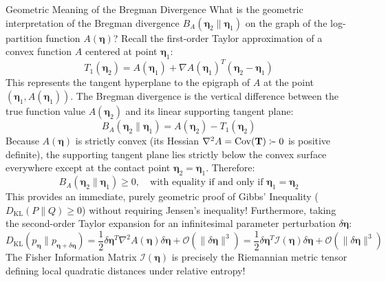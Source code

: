 \begin{ponderbox}{Geometric Meaning of the Bregman Divergence}
What is the geometric interpretation of the Bregman divergence $B_A(\boldsymbol{\eta}_2 \parallel \boldsymbol{\eta}_1)$ on the graph of the log-partition function $A(\boldsymbol{\eta})$?
\tcblower
Recall the first-order Taylor approximation of a convex function $A$ centered at point $\boldsymbol{\eta}_1$:
\begin{equation*}
T_1(\boldsymbol{\eta}_2) = A(\boldsymbol{\eta}_1) + \nabla A(\boldsymbol{\eta}_1)^T (\boldsymbol{\eta}_2 - \boldsymbol{\eta}_1)
\end{equation*}
This represents the tangent hyperplane to the epigraph of $A$ at the point $(\boldsymbol{\eta}_1, A(\boldsymbol{\eta}_1))$.
The Bregman divergence is the vertical difference between the true function value $A(\boldsymbol{\eta}_2)$ and its linear supporting tangent plane:
\begin{equation*}
B_A(\boldsymbol{\eta}_2 \parallel \boldsymbol{\eta}_1) = A(\boldsymbol{\eta}_2) - T_1(\boldsymbol{\eta}_2)
\end{equation*}
Because $A(\boldsymbol{\eta})$ is strictly convex (its Hessian $\nabla^2 A = \operatorname{Cov}(\mathbf{T}) \succ 0$ is positive definite), the supporting tangent plane lies strictly below the convex surface everywhere except at the contact point $\boldsymbol{\eta}_2 = \boldsymbol{\eta}_1$.
Therefore:
\begin{equation*}
B_A(\boldsymbol{\eta}_2 \parallel \boldsymbol{\eta}_1) \ge 0, \quad \text{with equality if and only if } \boldsymbol{\eta}_1 = \boldsymbol{\eta}_2
\end{equation*}
This provides an immediate, purely geometric proof of Gibbs' Inequality ($D_{\text{KL}}(P \parallel Q) \ge 0$) without requiring Jensen's inequality! Furthermore, taking the second-order Taylor expansion for an infinitesimal parameter perturbation $\delta \boldsymbol{\eta}$:
\begin{equation}
D_{\text{KL}}\left( p_{\boldsymbol{\eta}} \parallel p_{\boldsymbol{\eta} + \delta \boldsymbol{\eta}} \right) = \frac{1}{2}\delta \boldsymbol{\eta}^T \nabla^2 A(\boldsymbol{\eta}) \delta \boldsymbol{\eta} + \mathcal{O}(\|\delta \boldsymbol{\eta}\|^3) = \frac{1}{2}\delta \boldsymbol{\eta}^T \mathcal{I}(\boldsymbol{\eta}) \delta \boldsymbol{\eta} + \mathcal{O}(\|\delta \boldsymbol{\eta}\|^3)
\end{equation}
The Fisher Information Matrix $\mathcal{I}(\boldsymbol{\eta})$ is precisely the Riemannian metric tensor defining local quadratic distances under relative entropy!
\end{ponderbox}

